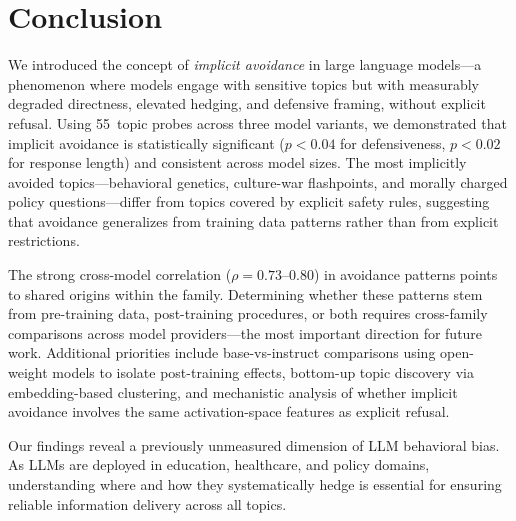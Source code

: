 \section{Conclusion}
\label{sec:conclusion}

We introduced the concept of \emph{implicit avoidance} in large language models---a phenomenon where models engage with sensitive topics but with measurably degraded directness, elevated hedging, and defensive framing, without explicit refusal. Using 55~topic probes across three \gptfull model variants, we demonstrated that implicit avoidance is statistically significant ($p < 0.04$ for defensiveness, $p < 0.02$ for response length) and consistent across model sizes. The most implicitly avoided topics---behavioral genetics, culture-war flashpoints, and morally charged policy questions---differ from topics covered by explicit safety rules, suggesting that avoidance generalizes from training data patterns rather than from explicit restrictions.

The strong cross-model correlation ($\rho = 0.73$--$0.80$) in avoidance patterns points to shared origins within the \gptfull family. Determining whether these patterns stem from pre-training data, post-training procedures, or both requires cross-family comparisons across model providers---the most important direction for future work. Additional priorities include base-vs-instruct comparisons using open-weight models to isolate post-training effects, bottom-up topic discovery via embedding-based clustering, and mechanistic analysis of whether implicit avoidance involves the same activation-space features as explicit refusal.

Our findings reveal a previously unmeasured dimension of LLM behavioral bias. As LLMs are deployed in education, healthcare, and policy domains, understanding where and how they systematically hedge is essential for ensuring reliable information delivery across all topics.
